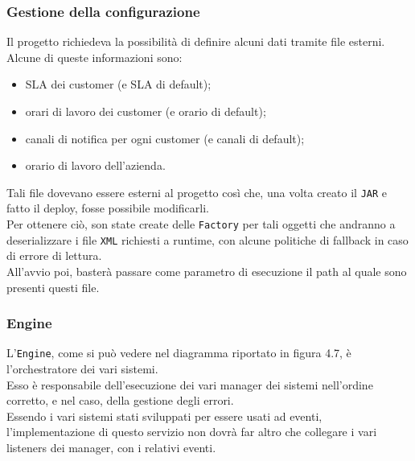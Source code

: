 		\subsubsection{Gestione della configurazione}
			Il progetto richiedeva la possibilità di definire alcuni dati tramite file esterni. \\
			Alcune di queste informazioni sono:
			\begin{itemize}
				\item SLA dei customer (e SLA di default);
				\item orari di lavoro dei customer (e orario di default);
				\item canali di notifica per ogni customer (e canali di default);
				\item orario di lavoro dell'azienda.
			\end{itemize}
			Tali file dovevano essere esterni al progetto così che, una volta creato il \texttt{JAR} e fatto il deploy, fosse possibile modificarli.\\
			Per ottenere ciò, son state create delle \texttt{Factory} per tali oggetti che andranno a deserializzare i file \texttt{XML} richiesti a runtime, con alcune politiche di fallback in caso di errore di lettura. \\
			All'avvio poi, basterà passare come parametro di esecuzione il path al quale sono presenti questi file.\\
		\subsubsection{Engine}
			L'\texttt{Engine}, come si può vedere nel diagramma riportato in figura 4.7, è l'orchestratore dei vari sistemi. \\
			Esso è responsabile dell'esecuzione dei vari manager dei sistemi nell'ordine corretto, e nel caso, della gestione degli errori. \\
			Essendo i vari sistemi stati sviluppati per essere usati ad eventi, l'implementazione di questo servizio non dovrà far altro che collegare i vari listeners dei manager, con i relativi eventi. \\

